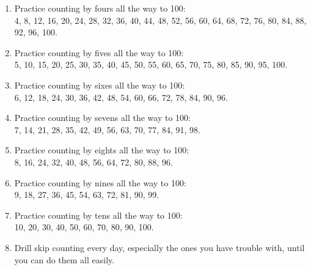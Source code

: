 \documentclass[12pt]{article}
\begin{document}
\begin{enumerate}
\item Practice counting by fours all the way to 100:\\
4, 8, 12, 16, 20, 24, 28, 32, 36, 40, 44, 48, 52, 56, 60, 64, 68, 72, 76, 80, 84, 88, 92, 96, 100.

\begin{center}
\end{center}

\item Practice counting by fives all the way to 100:\\
5, 10, 15, 20, 25, 30, 35, 40, 45, 50, 55, 60, 65, 70, 75, 80, 85, 90, 95, 100.\\

\item Practice counting by sixes all the way to 100:\\
6, 12, 18, 24, 30, 36, 42, 48, 54, 60, 66, 72, 78, 84, 90, 96.\\

\item Practice counting by sevens all the way to 100:\\
7, 14, 21, 28, 35, 42, 49, 56, 63, 70, 77, 84, 91, 98.\\

\item Practice counting by eights all the way to 100:\\
8, 16, 24, 32, 40, 48, 56, 64, 72, 80, 88, 96.\\

\item Practice counting by nines all the way to 100:\\
9, 18, 27, 36, 45, 54, 63, 72, 81, 90, 99.\\

\item Practice counting by tens all the way to 100:\\
10, 20, 30, 40, 50, 60, 70, 80, 90, 100.\\

\item Drill skip counting every day, especially the ones you have trouble with, until you can do them all easily.


\end{enumerate}
\end{document}
